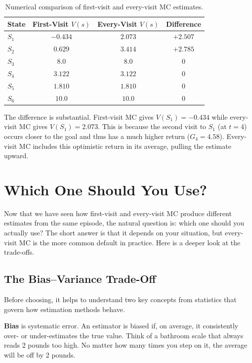 \documentclass[journal, onecolumn]{IEEEtran}
\newcommand{\vocab}[1]{\textbf{\textcolor{Garnet}{#1}}}
\begin{document}
\begin{table}[H]
\centering
\caption{Numerical comparison of first-visit and every-visit MC estimates.}
\label{tab:comparison}
\begin{tabular}{lccc}
\toprule
\textbf{State} & \textbf{First-Visit $V(s)$} & \textbf{Every-Visit $V(s)$} & \textbf{Difference} \\
\midrule
$S_1$ & $-0.434$ & $2.073$ & \textcolor{Rose}{$+2.507$} \\
$S_2$ & $0.629$  & $3.414$ & \textcolor{Rose}{$+2.785$} \\
$S_3$ & $8.0$    & $8.0$   & $0$ \\
$S_4$ & $3.122$  & $3.122$ & $0$ \\
$S_5$ & $1.810$  & $1.810$ & $0$ \\
$S_6$ & $10.0$   & $10.0$  & $0$ \\
\bottomrule
\end{tabular}
\end{table}

The difference is substantial. First-visit MC gives $V(S_1) = -0.434$ while every-visit MC gives $V(S_1) = 2.073$. This is because the second visit to $S_1$ (at $t=4$) occurs closer to the goal and thus has a much higher return ($G_4 = 4.58$). Every-visit MC includes this optimistic return in its average, pulling the estimate upward.

\section{Which One Should You Use?}

Now that we have seen how first-visit and every-visit MC produce different estimates from the same episode, the natural question is: which one should you actually use? The short answer is that it depends on your situation, but every-visit MC is the more common default in practice. Here is a deeper look at the trade-offs.

\subsection{The Bias--Variance Trade-Off}

Before choosing, it helps to understand two key concepts from statistics that govern how estimation methods behave.

\vocab{Bias} is systematic error. An estimator is biased if, on average, it consistently over- or under-estimates the true value. Think of a bathroom scale that always reads 2 pounds too high. No matter how many times you step on it, the average will be off by 2 pounds.
\end{document}
